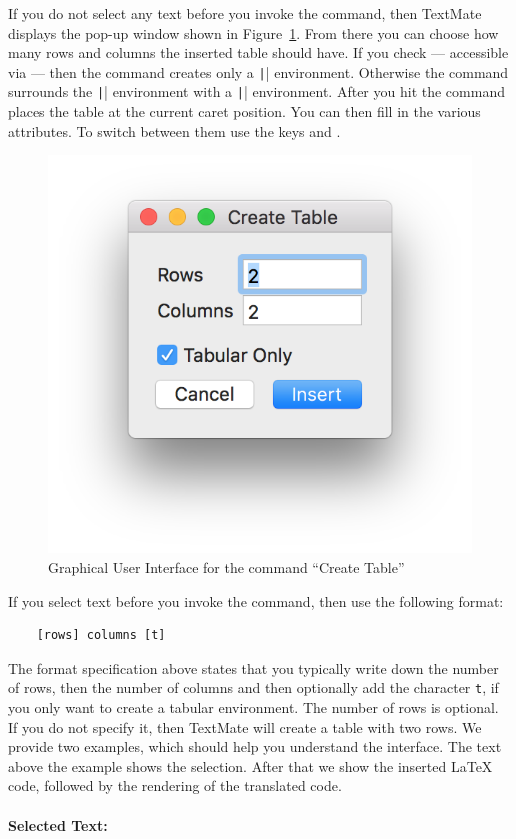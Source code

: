 \documentclass[11pt, x11names]{article}
\begin{document}
If you do not select any text before you invoke the command, then TextMate displays the pop-up window shown in Figure~\ref{fig:Figures_Table_-_Create_Table}. From there you can choose how many rows and columns the inserted table should have. If you check  — accessible via  — then the command creates only a \texttt|\tabular| environment. Otherwise the command surrounds the \texttt|\tabular| environment with a \texttt|\table| environment. After you hit  the command places the table at the current caret position. You can then fill in the various attributes. To switch between them use the keys \keys{\tab} and \keys{\shift + \tab}.

\begin{figure}[H]
  \centering
    \includegraphics[width=.5\textwidth]{Figures/Table - Create Table.png}
  \caption{Graphical User Interface for the command “Create Table”}
  \label{fig:Figures_Table_-_Create_Table}
\end{figure}

If you select text before you invoke the command, then use the following format:

\begin{verbatim}
    [rows] columns [t]
\end{verbatim}

The format specification above states that you typically write down the number of rows, then the number of columns and then optionally add the character \texttt{t}, if you only want to create a tabular environment. The number of rows is optional. If you do not specify it, then TextMate will create a table with two rows. We provide two examples, which should help you understand the interface. The text above the example shows the selection. After that we show the inserted LaTeX code, followed by the rendering of the translated code.

\paragraph{Selected Text: }
\end{document}
